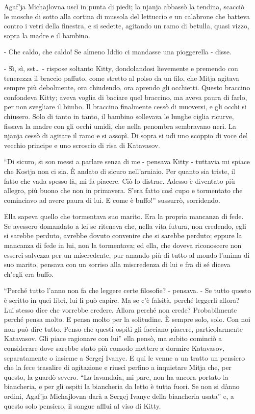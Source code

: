 \label{vii-7} 

Agaf'ja Michajlovna uscì in punta di piedi; la njanja abbassò la tendina, scacciò le mosche di sotto alla cortina di mussola del lettuccio e un calabrone che batteva contro i vetri della finestra, e si sedette, agitando un ramo di betulla, quasi vizzo, sopra la madre e il bambino. 

- Che caldo, che caldo! Se almeno Iddio ci mandasse una pioggerella - disse. 

- Sì, sì, sst\ldots{} - rispose soltanto Kitty, dondolandosi lievemente e premendo con tenerezza il braccio paffuto, come stretto al polso da un filo, che Mitja agitava sempre più debolmente, ora chiudendo, ora aprendo gli occhietti. Questo braccino confondeva Kitty; aveva voglia di baciare quel braccino, ma aveva paura di farlo, per non svegliare il bimbo. Il braccino finalmente cessò di muoversi, e gli occhi si chiusero. Solo di tanto in tanto, il bambino sollevava le lunghe ciglia ricurve, fissava la madre con gli occhi umidi, che nella penombra sembravano neri. La njanja cessò di agitare il ramo e si assopì. Di sopra si udì uno scoppio di voce del vecchio principe e uno scroscio di risa di Katavasov. 

``Di sicuro, si son messi a parlare senza di me - pensava Kitty - tuttavia mi spiace che Kostja non ci sia. È andato di sicuro nell'arniaio. Per quanto sia triste, il fatto che vada spesso là, mi fa piacere. Ciò lo distrae. Adesso è diventato più allegro, più buono che non in primavera. S'era fatto così cupo e tormentato che cominciavo ad avere paura di lui. E come è buffo!'' sussurrò, sorridendo. 

Ella sapeva quello che tormentava suo marito. Era la propria mancanza di fede. Se avessero domandato a lei se riteneva che, nella vita futura, non credendo, egli si sarebbe perduto, avrebbe dovuto convenire che si sarebbe perduto; eppure la mancanza di fede in lui, non la tormentava; ed ella, che doveva riconoscere non esserci salvezza per un miscredente, pur amando più di tutto al mondo l'anima di suo marito, pensava con un sorriso alla miscredenza di lui e fra di sé diceva ch'egli era buffo. 

``Perché tutto l'anno non fa che leggere certe filosofie? - pensava. - Se tutto questo è scritto in quei libri, lui li può capire. Ma se c'è falsità, perché leggerli allora? Lui stesso dice che vorrebbe credere. Allora perché non crede? Probabilmente perché pensa molto. E pensa molto per la solitudine. È sempre solo, solo. Con noi non può dire tutto. Penso che questi ospiti gli facciano piacere, particolarmente Katavasov. Gli piace ragionare con lui'' ella pensò, ma subito cominciò a considerare dove sarebbe stato più comodo mettere a dormire Katavasov, separatamente o insieme a Sergej Ivanyc. E qui le venne a un tratto un pensiero che la fece trasalire di agitazione e riuscì perfino a inquietare Mitja che, per questo, la guardò severo. ``La lavandaia, mi pare, non ha ancora portato la biancheria, e per gli ospiti la biancheria da letto è tutta fuori. Se non si dànno ordini, Agaf'ja Michajlovna darà a Sergej Ivanyc della biancheria usata'' e, a questo solo pensiero, il sangue affluì al viso di Kitty. 

